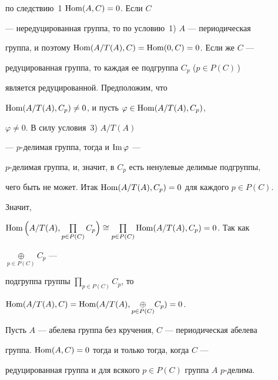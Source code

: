 \begin{pf}
по следствию~1\; $\operatorname{Hom}(A,C)=0$. Если $C$ 


--- нередуцированная группа, то по условию~1)\; $A$ --- периодическая 


группа, и поэтому $\operatorname{Hom}(A/T(A),C)=\operatorname{Hom}(0,C)=0$. Если же $C$ --- 


редуцированная группа, то каждая ее подгруппа $C_p$ ($p\in P(C)$\,) 


является редуцированной. Предположим, что 


$\operatorname{Hom}(A/T(A),C_p)\ne0$, и пусть $\varphi\in\operatorname{Hom}(A/T(A),C_p)$, 


$\varphi\ne0$. В силу условия~3)\; $A/T(A)$ 


--- $p$-делимая группа, тогда и $\operatorname{Im}\varphi$ --- 


$p$-делимая группа, и, значит, в $C_p$ есть ненулевые делимые подгруппы, 


чего быть не может. Итак $\operatorname{Hom}(A/T(A),C_p)=0$ для каждого $p\in P(C)$. 


Значит, 


$\Hom\Big(A/T(A),\prod\limits_{p\in P(C)}C_p\Big)\cong 


\prod\limits_{p\in P(C)}\Hom(A/T(A),C_p)=0$. Так как 


$\underset{p\in P(C)}{\oplus}{}C_p$ --- 


подгруппа группы $\prod\limits_{p\in P(C)}C_p$, то 


$\operatorname{Hom}(A/T(A),C)=\operatorname{Hom}(A/T(A),\underset{p\in P(C)}{\oplus}{}C_p)=0$. 


\end{pf} 


 


\begin{cor} 


Пусть $A$ --- абелева группа без кручения, $C$ --- периодическая абелева 


группа.\; $\operatorname{Hom}(A,C)=0$ тогда и только тогда, когда $C$ --- 


редуцированная группа и для всякого $p\in P(C)$ группа $A$\; $p$-делима. 


\end{cor} 


 


